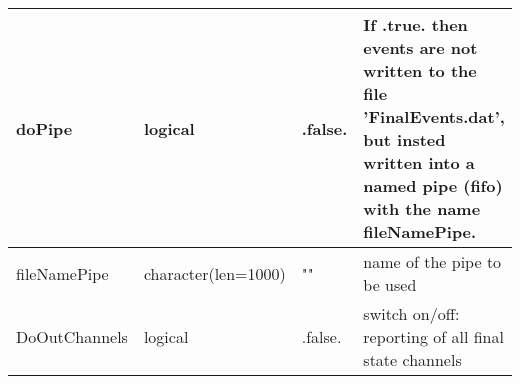\documentclass{article}
\begin{document}
\begin{longtable}{llll}
\midrule
doPipe & \begin{minipage}[t]{2cm}logical\end{minipage} & \begin{minipage}[t]{2cm}.false.\end{minipage} & \begin{minipage}[t]{12cm}If .true. then events are not written to the file 'FinalEvents.dat', but insted written into a named pipe (fifo) with the name fileNamePipe.\end{minipage}\\*
\midrule
fileNamePipe & \begin{minipage}[t]{2cm}character(len=1000)\end{minipage} & \begin{minipage}[t]{2cm}""\end{minipage} & \begin{minipage}[t]{12cm}name of the pipe to be used\end{minipage}\\*
\midrule
DoOutChannels & \begin{minipage}[t]{2cm}logical\end{minipage} & \begin{minipage}[t]{2cm}.false.\end{minipage} & \begin{minipage}[t]{12cm}switch on/off: reporting of all final state channels\end{minipage}\\*
\bottomrule
\end{longtable}
{ }



\end{document}
